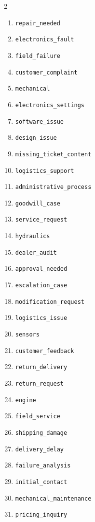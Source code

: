 \begin{multicols}{2}
\begin{enumerate}
    \item \texttt{repair\_\allowbreak needed}
    \item \texttt{electronics\_\allowbreak fault}
    \item \texttt{field\_\allowbreak failure}
    \item \texttt{customer\_\allowbreak complaint}
    \item \texttt{mechanical}
    \item \texttt{electronics\_\allowbreak settings}
    \item \texttt{software\_\allowbreak issue}
    \item \texttt{design\_\allowbreak issue}
    \item \texttt{missing\_\allowbreak ticket\_\allowbreak content}
    \item \texttt{logistics\_\allowbreak support}
    \item \texttt{administrative\_\allowbreak process}
    \item \texttt{goodwill\_\allowbreak case}
    \item \texttt{service\_\allowbreak request}
    \item \texttt{hydraulics}
    \item \texttt{dealer\_\allowbreak audit}
    \item \texttt{approval\_\allowbreak needed}
    \item \texttt{escalation\_\allowbreak case}
    \item \texttt{modification\_\allowbreak request}
    \item \texttt{logistics\_\allowbreak issue}
    \item \texttt{sensors}
    \item \texttt{customer\_\allowbreak feedback}
    \item \texttt{return\_\allowbreak delivery}
    \item \texttt{return\_\allowbreak request}
    \item \texttt{engine}
    \item \texttt{field\_\allowbreak service}
    \item \texttt{shipping\_\allowbreak damage}
    \item \texttt{delivery\_\allowbreak delay}
    \item \texttt{failure\_\allowbreak analysis}
    \item \texttt{initial\_\allowbreak contact}
    \item \texttt{mechanical\_\allowbreak maintenance}
    \item \texttt{pricing\_\allowbreak inquiry}

\end{enumerate}
\end{multicols}
